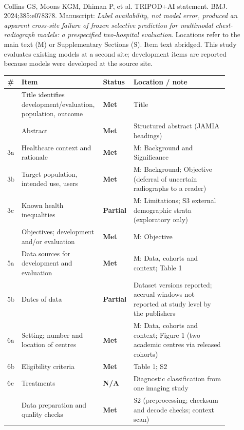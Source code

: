 \documentclass[9pt,a4paper]{extarticle}
\newcommand{\met}{\textbf{Met}}
\newcommand{\partl}{\textbf{Partial}}
\newcommand{\na}{\textbf{N/A}}
\begin{document}
\\[2pt]
Collins GS, Moons KGM, Dhiman P, et al. TRIPOD+AI statement. BMJ.
2024;385:e078378. Manuscript: \emph{Label availability, not model error,
produced an apparent cross-site failure of frozen selective prediction for
multimodal chest-radiograph models: a prespecified two-hospital evaluation}. Locations refer to the
main text (M) or Supplementary Sections (S). Item text abridged. This study
evaluates existing models at a second site; development items are reported
because models were developed at the source site.

\small
\begin{longtable}{>{\raggedright\arraybackslash}p{0.05\linewidth}>{\raggedright\arraybackslash}p{0.35\linewidth}>{\raggedright\arraybackslash}p{0.08\linewidth}>{\raggedright\arraybackslash}p{0.42\linewidth}}
\toprule
\# & Item & Status & Location / note\\
\midrule\endhead
1 & Title identifies development/evaluation, population, outcome & \met & Title\\
2 & Abstract & \met & Structured abstract (JAMIA headings)\\
3a & Healthcare context and rationale & \met & M: Background and Significance\\
3b & Target population, intended use, users & \met & M: Background; Objective (deferral of uncertain radiographs to a reader)\\
3c & Known health inequalities & \partl & M: Limitations; S3 external demographic strata (exploratory only)\\
4 & Objectives; development and/or evaluation & \met & M: Objective\\
5a & Data sources for development and evaluation & \met & M: Data, cohorts and context; Table 1\\
5b & Dates of data & \partl & Dataset versions reported; accrual windows not reported at study level by the publishers\\
6a & Setting; number and location of centres & \met & M: Data, cohorts and context; Figure 1 (two academic centres via released cohorts)\\
6b & Eligibility criteria & \met & Table 1; S2\\
6c & Treatments & \na & Diagnostic classification from one imaging study\\
7 & Data preparation and quality checks & \met & S2 (preprocessing; checksum and decode checks; context scan)\\

\end{longtable}
\end{document}
